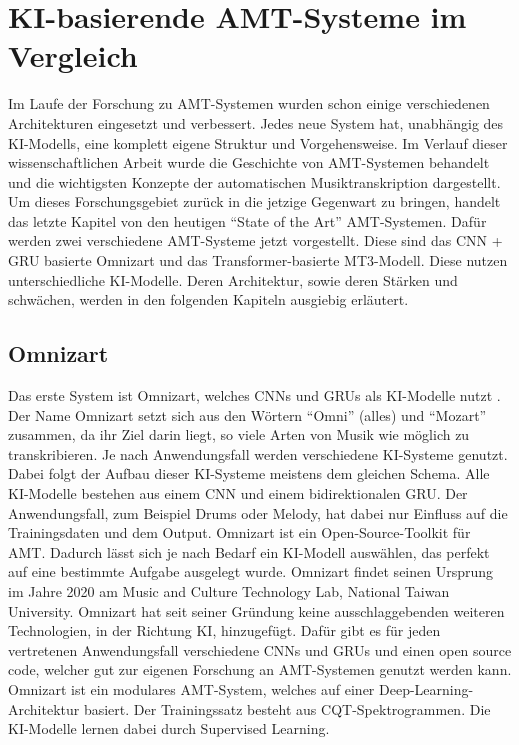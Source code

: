 \section{KI-basierende AMT-Systeme im Vergleich}
Im Laufe der Forschung zu AMT-Systemen wurden schon einige verschiedenen Architekturen eingesetzt und verbessert.
Jedes neue System hat, unabhängig des KI-Modells, eine komplett eigene Struktur und Vorgehensweise.
Im Verlauf dieser wissenschaftlichen Arbeit wurde die Geschichte von AMT-Systemen behandelt
und die wichtigsten Konzepte der automatischen Musiktranskription dargestellt.
Um dieses Forschungsgebiet zurück in die jetzige Gegenwart zu bringen,
handelt das letzte Kapitel von den heutigen \enquote{State of the Art} AMT-Systemen.
Dafür werden zwei verschiedene AMT-Systeme jetzt vorgestellt.
Diese sind das CNN + GRU basierte Omnizart und das Transformer-basierte MT3-Modell.
Diese nutzen unterschiedliche KI-Modelle.
Deren Architektur, sowie deren Stärken und schwächen, werden in den folgenden Kapiteln ausgiebig erläutert.

\subsection{Omnizart}
Das erste System ist Omnizart, welches CNNs und GRUs als KI-Modelle nutzt \cite{wu2021omnizart}.
Der Name Omnizart setzt sich aus den Wörtern \enquote{Omni} (alles) und \enquote{Mozart} zusammen,
da ihr Ziel darin liegt, so viele Arten von Musik wie möglich zu transkribieren.
Je nach Anwendungsfall werden verschiedene KI-Systeme genutzt.
Dabei folgt der Aufbau dieser KI-Systeme meistens dem gleichen Schema.
Alle KI-Modelle bestehen aus einem CNN und einem bidirektionalen GRU.
Der Anwendungsfall, zum Beispiel Drums oder Melody, hat dabei nur Einfluss auf die Trainingsdaten und dem Output.
Omnizart ist ein Open-Source-Toolkit für AMT.
Dadurch lässt sich je nach Bedarf ein KI-Modell auswählen, das perfekt auf eine bestimmte Aufgabe ausgelegt wurde.
Omnizart findet seinen Ursprung im Jahre 2020 am Music and Culture Technology Lab, National Taiwan University.
Omnizart hat seit seiner Gründung keine ausschlaggebenden weiteren Technologien, in der Richtung KI, hinzugefügt.
Dafür gibt es für jeden vertretenen Anwendungsfall verschiedene CNNs und GRUs und einen open source code,
welcher gut zur eigenen Forschung an AMT-Systemen genutzt werden kann.
Omnizart ist ein modulares AMT-System, welches auf einer Deep-Learning-Architektur basiert.
Der Trainingssatz besteht aus CQT-Spektrogrammen.
Die KI-Modelle lernen dabei durch Supervised Learning.

